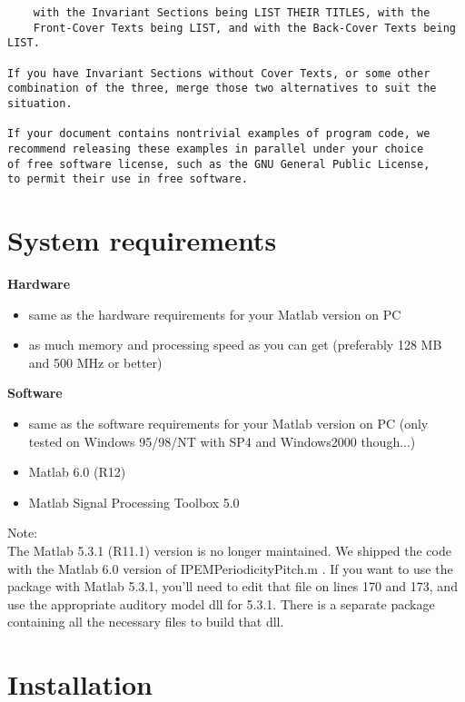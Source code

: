 \begin{verbatim}
    with the Invariant Sections being LIST THEIR TITLES, with the
    Front-Cover Texts being LIST, and with the Back-Cover Texts being LIST.

If you have Invariant Sections without Cover Texts, or some other
combination of the three, merge those two alternatives to suit the
situation.

If your document contains nontrivial examples of program code, we
recommend releasing these examples in parallel under your choice
of free software license, such as the GNU General Public License,
to permit their use in free software.
\end{verbatim}

\section{System requirements}

\textbf{Hardware}
\begin{itemize}
\item same as the hardware requirements for your Matlab version on PC
\item as much memory and processing speed as you can get (preferably 128 MB and 500 MHz or better)
\end{itemize}

\textbf{Software}
\begin{itemize}
\item same as the software requirements for your Matlab version on
PC (only tested on Windows 95/98/NT with SP4 and Windows2000
though...)
\item Matlab 6.0 (R12)
\item Matlab Signal Processing Toolbox 5.0
\end{itemize}

Note:\\
The Matlab 5.3.1 (R11.1) version is no longer maintained. We
shipped the code with the Matlab 6.0 version of
IPEMPeriodicityPitch.m . If you want to use the package with
Matlab 5.3.1, you'll need to edit that file on lines 170 and 173,
and use the appropriate auditory model dll for 5.3.1. There is a
separate package containing all the necessary files to build that
dll.


\section{Installation}

